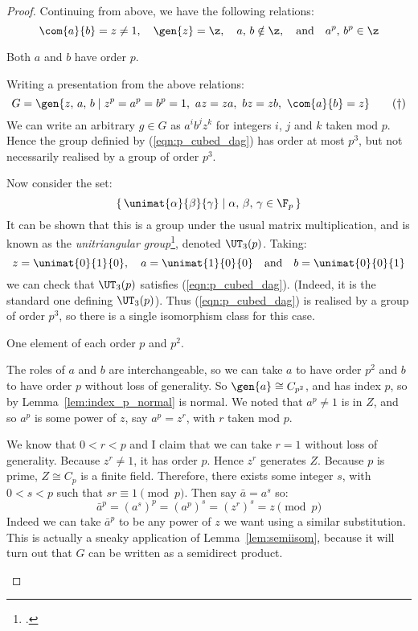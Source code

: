 \begin{proof}
Continuing from above, we have the following relations:
\[ \com{a}{b} = z \neq 1, \quad \gen{z} = \z, \quad a,\,b \notin \z, \quad \text{and} \quad a^p,\,b^p \in \z \]

\begin{case}
    \item Both \(a\) and \(b\) have order \(p\).

        Writing a presentation from the above relations:
        \[G = \gen{z,\,a,\,b \mid z^p = a^p = b^p = 1,\ az = za,\ bz = zb,\ \com{a}{b} = z} \tag{\dag}\label{eqn:p_cubed_dag}\]
        We can write an arbitrary \(g \in G\) as \(a^i b^j z^k\) for integers \(i\), \(j\) and \(k\) taken mod \(p\).
        Hence the group definied by (\ref{eqn:p_cubed_dag}) has order at most \(p^3\), but not necessarily realised by a group of order \(p^3\).

        Now consider the set:
        \[\left\{\,\unimat{\alpha}{\beta}{\gamma} \mid \alpha,\,\beta,\,\gamma \in \F_p\,\right\}\]
        It can be shown that this is a group under the usual matrix multiplication, and is known as the
        \emph{unitriangular group}\footcite{unitriangular}, denoted \(\UT_3(p)\).
        Taking:
        \[z = \unimat{0}{1}{0}, \quad a = \unimat{1}{0}{0} \quad \text{and} \quad b = \unimat{0}{0}{1}\]
        we can check that \(\UT_3(p)\) satisfies (\ref{eqn:p_cubed_dag}).
        (Indeed, it is the standard one defining \(\UT_3(p)\)).
        Thus (\ref{eqn:p_cubed_dag}) is realised by a group of order \(p^3\), so there is a single isomorphism class for this case.

    \item One element of each order \(p\) and \(p^2\).

        The roles of \(a\) and \(b\) are interchangeable, so we can take \(a\) to have order \(p^2\) and \(b\) to have
        order \(p\) without loss of generality.
        So \(\gen{a} \cong C_{p^2}\), and has index \(p\), so by Lemma~\ref{lem:index_p_normal} is normal.
        We noted that \(a^p \neq 1\) is in \(Z\), and so \(a^p\) is some power of \(z\), say \(a^p = z^r\), with \(r\)
        taken mod \(p\).

        We know that \(0 < r < p\) and I claim that we can take \(r = 1\) without loss of generality.
        Because \(z^r \neq 1\), it has order \(p\).
        Hence \(z^r\) generates \(Z\).
        Because \(p\) is prime, \(Z \cong C_p\) is a finite field.
        Therefore, there exists some integer \(s\), with \(0 < s < p\) such that \(sr \equiv 1 \pmod{p}\).
        Then say \(\bar{a} = a^s\) so:
        \[\bar{a}^p = {(a^s)}^p = {(a^p)}^s = {(z^r)}^s = z \pmod{p}\]
        Indeed we can take \(\bar{a}^p\) to be any power of \(z\) we want using a similar substitution.
        This is actually a sneaky application of Lemma~\ref{lem:semiisom}, because it will turn out that \(G\) can be
        written as a semidirect product.


\end{case}
\end{proof}

